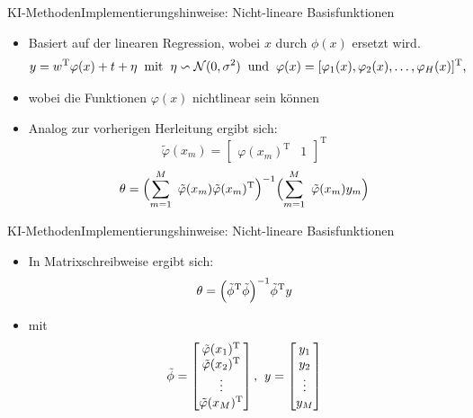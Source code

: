 \documentclass[169, handout	]{THIbeamer} %
\begin{document}
	\begin{frame}{KI-Methoden}{Implementierungshinweise: Nicht-lineare Basisfunktionen}
		\begin{itemize}
			\item Basiert auf der linearen Regression, wobei $x$ durch $\phi (x)$ ersetzt wird.
			\begin{equation}
				y = w^{\text{T}} \varphi (x) + t + \eta
				\hspace{0.2 cm}
				\text{mit}
				\hspace{0.2 cm}
				\eta \backsim \mathcal{N}(0, \sigma^2)
				\hspace{0.2 cm}
				\text{und} \hspace{0.2 cm} 			
				\varphi (x) = [ \varphi_1 (x), \varphi_2 (x), \dots, \varphi_H (x)]^{\text{T}} \text{,}
			\end{equation}
			\item[] wobei die Funktionen $\varphi (x)$ nichtlinear sein können
			\item Analog zur vorherigen Herleitung ergibt sich:
			\begin{equation}
				\tilde{\varphi} (x_m)= 
				\begin{bmatrix}
					\varphi (x_m)^{\text{T}} & 1
				\end{bmatrix}^{\text{T}}
			\end{equation}
			\begin{equation}
				\theta = \Bigl( \sum_{m=1}^M\ \tilde{\varphi} (x_m) \tilde{\varphi} (x_m)^{\text{T}} \Bigr)^{-1} \Bigl( \sum_{m=1}^M\ \tilde{\varphi} (x_m) y_m \Bigr) 
			\end{equation}
		\end{itemize}
	\end{frame}
	\begin{frame}{KI-Methoden}{Implementierungshinweise: Nicht-lineare Basisfunktionen}
		\begin{itemize}
			\item In Matrixschreibweise ergibt sich:			
		\begin{equation}
			\theta = \Bigl( \tilde{\phi}^{\text{T}} \tilde{\phi} \Bigr) ^{-1} \tilde{\phi}^{\text{T}} y
		\end{equation}
		\item[] mit
		\begin{equation}
			\tilde{\phi} =
			\begin{bmatrix}
				\tilde{\varphi} (x_1)^{\text{T}} \\
				\tilde{\varphi} (x_2)^{\text{T}} \\
				\vdots \\
				\tilde{\varphi} (x_M)^{\text{T}} \\			
			\end{bmatrix}
			\text{,}
			\hspace{0.2 cm}
			y = 
			\begin{bmatrix}
				y_1 \\
				y_2 \\
				\vdots \\
				y_M
			\end{bmatrix}
		\end{equation}
		\end{itemize}	
	\end{frame}			
\end{document}
